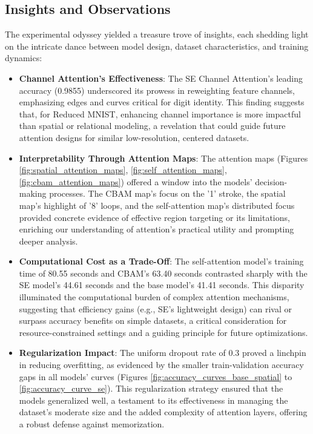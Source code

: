 \documentclass[12pt]{article}
\begin{document}
\subsection{Insights and Observations}
The experimental odyssey yielded a treasure trove of insights, each shedding light on the intricate dance between model design, dataset characteristics, and training dynamics:
\begin{itemize}
    \item \textbf{Channel Attention's Effectiveness}: The SE Channel Attention's leading accuracy (0.9855) underscored its prowess in reweighting feature channels, emphasizing edges and curves critical for digit identity. This finding suggests that, for Reduced MNIST, enhancing channel importance is more impactful than spatial or relational modeling, a revelation that could guide future attention designs for similar low-resolution, centered datasets.
    \item \textbf{Interpretability Through Attention Maps}: The attention maps (Figures \ref{fig:spatial_attention_maps}, \ref{fig:self_attention_maps}, \ref{fig:cbam_attention_maps}) offered a window into the models' decision-making processes. The CBAM map's focus on the '1' stroke, the spatial map's highlight of '8' loops, and the self-attention map's distributed focus provided concrete evidence of effective region targeting or its limitations, enriching our understanding of attention's practical utility and prompting deeper analysis.
    \item \textbf{Computational Cost as a Trade-Off}: The self-attention model's training time of 80.55 seconds and CBAM's 63.40 seconds contrasted sharply with the SE model's 44.61 seconds and the base model's 41.41 seconds. This disparity illuminated the computational burden of complex attention mechanisms, suggesting that efficiency gains (e.g., SE's lightweight design) can rival or surpass accuracy benefits on simple datasets, a critical consideration for resource-constrained settings and a guiding principle for future optimizations.
    \item \textbf{Regularization Impact}: The uniform dropout rate of 0.3 proved a linchpin in reducing overfitting, as evidenced by the smaller train-validation accuracy gaps in all models' curves (Figures \ref{fig:accuracy_curves_base_spatial} to \ref{fig:accuracy_curve_se}). This regularization strategy ensured that the models generalized well, a testament to its effectiveness in managing the dataset's moderate size and the added complexity of attention layers, offering a robust defense against memorization.
\end{itemize}
\end{document}
